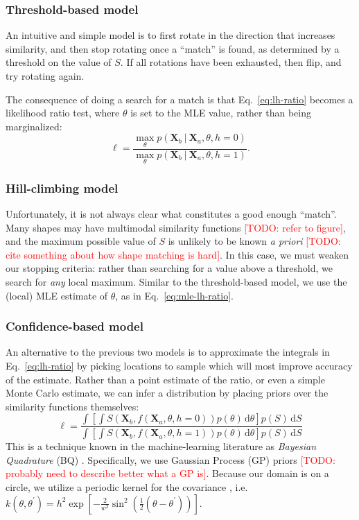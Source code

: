 \documentclass[10pt,letterpaper]{article}
\newcommand{\TODO}[1]{\textcolor{red}{[TODO: #1]}}
\newcommand{\Xa}[0]{\mathbf{X}_a}
\newcommand{\Xb}[0]{\mathbf{X}_b}
\newcommand{\hi}[0]{h=0}
\newcommand{\hf}[0]{h=1}
\newcommand{\dif}[0]{\,\mathrm{d}}
\begin{document}
\subsubsection{Threshold-based model}

An intuitive and simple model is to first rotate in the direction that
increases similarity, and then stop rotating once a ``match'' is
found, as determined by a threshold on the value of $S$. If all
rotations have been exhausted, then flip, and try rotating again.

The consequence of doing a search for a match is that
Eq.~\ref{eq:lh-ratio} becomes a likelihood ratio test, where $\theta$
is set to the MLE value, rather than being marginalized:
\begin{equation}
  \ell = \frac{\max_\theta p(\Xb\ \vert\ \Xa, \theta, \hi)}{\max_\theta p(\Xb\ \vert\ \Xa, \theta, \hf)}.
  \label{eq:mle-lh-ratio}
\end{equation}

\subsubsection{Hill-climbing model}

Unfortunately, it is not always clear what constitutes a good enough
``match''. Many shapes may have multimodal similarity functions
\TODO{refer to figure}, and the maximum possible value of $S$ is
unlikely to be known \textit{a priori} \TODO{cite something about how
  shape matching is hard}. In this case, we must weaken our stopping
criteria: rather than searching for a value above a threshold, we
search for \textit{any} local maximum.  Similar to the threshold-based
model, we use the (local) MLE estimate of $\theta$, as in
Eq.~\ref{eq:mle-lh-ratio}.

\subsubsection{Confidence-based model}

An alternative to the previous two models is to approximate the
integrals in Eq.~\ref{eq:lh-ratio} by picking locations to sample
which will most improve accuracy of the estimate. Rather than a point
estimate of the ratio, or even a simple Monte Carlo estimate, we can
infer a distribution by placing priors over the similarity functions
themselves:
\begin{equation}
\ell = \frac{\int \left[\int S(\Xb, f(\Xa, \theta, \hi))p(\theta)\dif\theta\right] p(S)\dif S}{\int \left[\int S(\Xb, f(\Xa, \theta, \hf))p(\theta)\dif\theta\right] p(S)\dif S}
\end{equation}
This is a technique known in the machine-learning literature as
\textit{Bayesian Quadrature} (BQ)
\cite{Diaconis:1988uo,OHagan:1991tx,Osborne:2012tm}. Specifically, we
use Gaussian Process (GP) priors \cite{Osborne:2012tm} \TODO{probably
  need to describe better what a GP is}. Because our domain is on a
circle, we utilize a periodic kernel for the covariance
\cite{Rasmussen:2006vz}, i.e. $k(\theta,
\theta^\prime)=h^2\exp[-\frac{2}{w^2}\sin^2(\frac{1}{2}(\theta-\theta^\prime))]$.
\end{document}
